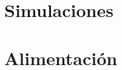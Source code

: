 \section{Simulaciones}
\resetallcounters

\clearpage

\section{Alimentación}
\resetallcounters

\clearpage


